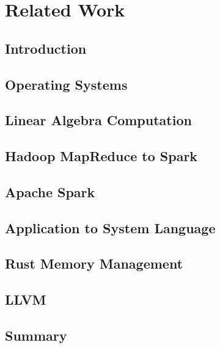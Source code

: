 \chapter{Related Work}
\label{chapter:relatedwork}
\thispagestyle{myheadings}

\graphicspath{{2_RelatedWork/Figures/}}

\section{Introduction}
\label{sec:related_intro}


\section{Operating Systems}
\label{sec:os}


\section{Linear Algebra Computation}
\label{sec:linalg}


\section{Hadoop MapReduce to Spark}
\label{sec:hadoopspark}


\section{Apache Spark}
\label{sec:spark}


\section{Application to System Language}
\label{sec:appsys}


\section{Rust Memory Management}
\label{sec:rustmem}


\section{LLVM}
\label{sec:llvm}


\section{Summary}
\label{sec:related_summary}


% 


% 

\clearpage



